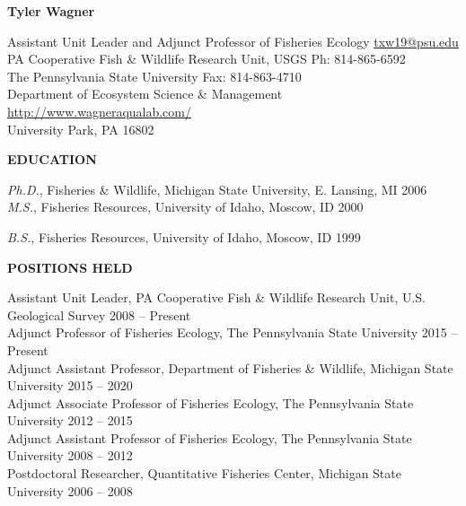 \documentclass[10pt]{article}
\begin{document}
\centerline {\bf{\Large Tyler Wagner}}
\vspace{8pt}
\begin{flushleft}
Assistant Unit Leader and Adjunct Professor of Fisheries Ecology \hfill \href{mailto:txw19@psu.edu}{txw19@psu.edu}\\
PA Cooperative Fish \& Wildlife Research Unit, USGS \hfill Ph: 814-865-6592\\
 The Pennsylvania State University  \hfill Fax: 814-863-4710\\
 Department of Ecosystem Science \& Management \hfill  \url{http://www.wagneraqualab.com/}\\
University Park, PA 16802\\


\vspace{8pt}

\centerline {\bf{EDUCATION}}

\vspace{5pt}
{\sl Ph.D.}, 
Fisheries \& Wildlife, 
Michigan State University, E. Lansing, MI \hfill 2006 \\ 
\vspace{5pt}
{\sl M.S.}, Fisheries Resources,
University of Idaho, Moscow, ID \hfill 2000

\vspace{5pt}

{\sl B.S.}, Fisheries Resources,
University of Idaho, Moscow, ID \hfill 1999

\vspace{8pt}
\centerline {\bf{POSITIONS HELD}}
\vspace{5pt}
Assistant Unit Leader, PA Cooperative Fish \& Wildlife Research Unit, U.S. Geological Survey \hfill 2008 -- Present \\
Adjunct Professor of Fisheries Ecology, The Pennsylvania State University  \hfill 2015 -- Present \\
Adjunct Assistant Professor, Department of Fisheries \& Wildlife, Michigan State University \hfill 2015 -- 2020 \\
Adjunct Associate Professor of Fisheries Ecology, The Pennsylvania State University  \hfill 2012 -- 2015 \\
Adjunct Assistant Professor of Fisheries Ecology, The Pennsylvania State University  \hfill 2008 -- 2012 \\
Postdoctoral Researcher, Quantitative Fisheries Center, Michigan State University \hfill 2006 -- 2008 \\


\end{flushleft}
\end{document}
